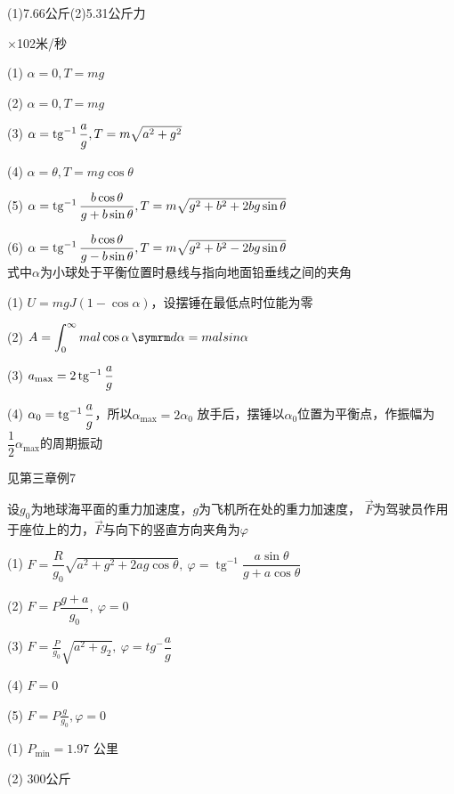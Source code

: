\achapter

\answer (1)7.66公斤(2)5.31公斤力

×102米/秒

\answer (1) $ \alpha = 0 , T = m g $

(2) $ \alpha = 0 , T = m g $

(3) $ \alpha = \operatorname{tg} ^ { - 1 } \dfrac { a } { g }, T = m \sqrt { a ^ { 2 } + g ^ { 2 } }  $

(4) $ \alpha = \theta , T = m g \cos \theta $

(5) $ \alpha = \operatorname{tg} ^ { - 1 } \dfrac { b \cos \theta } { g + b \sin \theta }  ,
T = m \sqrt { g ^ { 2 } + b ^ { 2 } + 2 b g \sin \theta }  $

(6) $ \alpha = \operatorname{tg} ^ { - 1 } \dfrac { b \cos \theta } { g - b \sin \theta } ,
T = m \sqrt { g ^ { 2 } + b ^ { 2 } - 2 b g \sin \theta }  $ \\
式中$ \alpha $为小球处于平衡位置时悬线与指向地面铅垂线之间的夹角

\answer (1) $ U = m g J \left( 1 - \cos \alpha \right) $，设摆锤在最低点时位能为零

(2) $\displaystyle A = \int_{ 0 } ^ \infty m a l \cos \alpha \dif \alpha = m a l sin \alpha  $

(3) $ a _ { \text{max} } = 2 \operatorname{tg} ^ { - 1 } \dfrac { a } { g }$

(4) $\alpha _ { 0 } = \operatorname{tg} ^ { - 1 } \dfrac { a } { g }  $，所以$  \alpha _ { \text{max} } = 2 \alpha _ { 0 } $
放手后，摆锤以$ \alpha_{ 0 } $位置为平衡点，作振幅为$ \dfrac { 1 } { 2 } \alpha _ { \text{max} }   $的周期振动

\answer 见第三章例7

\answer 设$ g_0 $为地球海平面的重力加速度，$ g $为飞机所在处的重力加速度，
$ \vec{F} $为驾驶员作用于座位上的力，$\vec{F}$与向下的竖直方向夹角为$\varphi$

(1) $F=\dfrac{R}{g_{0}} \sqrt{a^{2}+g^{2}+2 a g \cos \theta}, ~\varphi=\operatorname{tg}^{-1} \dfrac{a \sin \theta}{g+a \cos \theta}$

(2) $ F = P \dfrac { g + a } { g _ { 0 } } ,~ \varphi = 0  $

(3) $  F = \frac { P } { g _ { 0 } } \sqrt { a ^ { 2 } + g _ { 2 } }, ~\varphi = t g ^ { - }  \dfrac { a } { g } $

(4) $ F = 0  $

(5) $ F = P \frac { g } { g _ { 0 } } , \varphi = 0  $

\answer (1) $ P _ { \text{min} } = 1 . 9 7  $ 公里

(2) $ 300 $公斤

